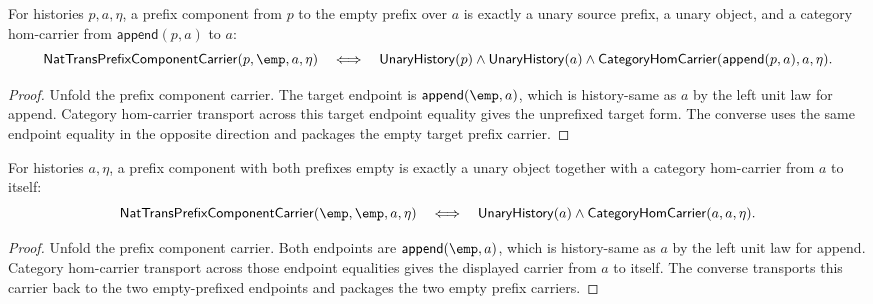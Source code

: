 \begin{theorem}
\label{thm:nattrans-prefix-component-empty-target-prefix-iff}
For histories $p,a,\eta$, a prefix component from $p$ to the empty prefix over
$a$ is exactly a unary source prefix, a unary object, and a category hom-carrier
from $\mathsf{append}(p,a)$ to $a$:
$$
\mathsf{NatTransPrefixComponentCarrier}(p,\emp,a,\eta)
\quad\Longleftrightarrow\quad
\mathsf{UnaryHistory}(p)\wedge
\mathsf{UnaryHistory}(a)\wedge
\mathsf{CategoryHomCarrier}(\mathsf{append}(p,a),a,\eta).
$$
\end{theorem}
\begin{proof}
Unfold the prefix component carrier. The target endpoint is
$\mathsf{append}(\emp,a)$, which is history-same as $a$ by the left unit law
for append. Category hom-carrier transport across this target endpoint
equality gives the unprefixed target form. The converse uses the same endpoint
equality in the opposite direction and packages the empty target prefix
carrier.
\end{proof}

\begin{theorem}
\label{thm:nattrans-prefix-component-carrier-empty-prefixes-iff}
For histories $a,\eta$, a prefix component with both prefixes empty is exactly
a unary object together with a category hom-carrier from $a$ to itself:
$$
\mathsf{NatTransPrefixComponentCarrier}(\emp,\emp,a,\eta)
\quad\Longleftrightarrow\quad
\mathsf{UnaryHistory}(a)\wedge
\mathsf{CategoryHomCarrier}(a,a,\eta).
$$
\end{theorem}
\begin{proof}
Unfold the prefix component carrier. Both endpoints are
$\mathsf{append}(\emp,a)$, which is history-same as $a$ by the left unit law
for append. Category hom-carrier transport across those endpoint equalities
gives the displayed carrier from $a$ to itself. The converse transports this
carrier back to the two empty-prefixed endpoints and packages the two empty
prefix carriers.
\end{proof}

